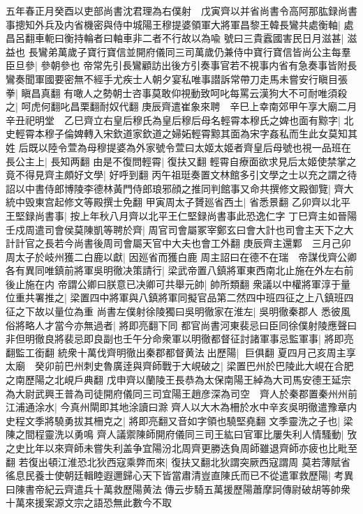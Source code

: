 五年春正月癸酉以吏部尚書沈君理為右僕射　戊寅齊以并省尚書令高阿那肱録尚書事摠知外兵及内省機密與侍中城陽王穆提婆領軍大將軍昌黎王韓長鸞共處衡軸|{
	處昌呂翻車軛曰衡持輪者曰軸車非二者不行故以為喩}
號曰三貴蠧國害民日月滋甚|{
	滋益也}
長鸞弟萬歲子寶行寶信並開府儀同三司萬歲仍兼侍中寶行寶信皆尚公主每羣臣旦參|{
	參朝參也}
帝常先引長鸞顧訪出後方引奏事官若不視事内省有急奏事皆附長鸞奏聞軍國要密無不經手尤疾士人朝夕宴私唯事譛訴常帶刀走馬未嘗安行瞋目張拳|{
	瞋昌真翻}
有噉人之勢朝士咨事莫敢仰視動致呵叱每罵云漢狗大不可耐唯須殺之|{
	呵虎何翻叱昌栗翻耐奴代翻}
庚辰齊遣崔象來聘　辛巳上幸南郊甲午享大廟二月辛丑祀明堂　乙巳齊立右皇后穆氏為皇后穆后母名輕霄本穆氏之婢也面有黥字|{
	北史輕霄本穆子倫婢轉入宋欽道家欽道之婦妬輕霄黥其面為宋字姦私而生此女莫知其姓}
后既以陸令萱為母穆提婆為外家號令萱曰太姬太姬者齊皇后母號也視一品班在長公主上|{
	長知两翻}
由是不復問輕霄|{
	復扶又翻}
輕霄自療面欲求見后太姬使禁掌之竟不得見齊主頗好文學|{
	好呼到翻}
丙午祖珽奏置文林館多引文學之士以充之謂之待詔以中書侍郎博陵李德林黃門侍郎琅邪顔之推同判館事又命共撰修文殿御覽|{
	齊大統中毁東宫起修文等殿撰士免翻}
甲寅周太子贇廵省西土|{
	省悉景翻}
乙卯齊以北平王堅録尚書事|{
	按上年秋八月齊以北平王仁堅録尚書事此恐逸仁字}
丁巳齊主如晉陽　壬戍周遣司會侯莫陳凱等聘於齊|{
	周官司會屬冢宰鄭玄曰會大計也司會主天下之大計計官之長若今尚書後周司會屬天官中大夫也會工外翻}
庚辰齊主還鄴　三月己卯周太子於岐州獲二白鹿以獻|{
	因廵省而獲白鹿}
周主詔曰在德不在瑞　帝謀伐齊公卿各有異同唯鎮前將軍吳明徹决策請行|{
	梁武帝置八鎮將軍東西南北止施在外左右前後止施在内}
帝謂公卿曰朕意已决卿可共舉元帥|{
	帥所類翻}
衆議以中權將軍淳于量位重共署推之|{
	梁置四中將軍與八鎮將軍同擬官品第二然四中班四征之上八鎮班四征之下故以量位為重}
尚書左僕射徐陵獨曰吳明徹家在淮左|{
	吳明徹秦郡人}
悉彼風俗將略人才當今亦無過者|{
	將即亮翻下同}
都官尚書河東裴忌曰臣同徐僕射陵應聲曰非但明徹良將裴忌即良副也壬午分命衆軍以明徹都督征討諸軍事忌監軍事|{
	將即亮翻監工銜翻}
統衆十萬伐齊明徹出秦郡都督黄法出歷陽|{
	巨俱翻}
夏四月己亥周主享太廟　癸卯前巴州刺史魯廣逹與齊師戰于大峴破之|{
	梁置巴州於巴陵此大峴在合肥之南歷陽之北峴戶典翻}
戊申齊以蘭陵王長恭為太保南陽王綽為大司馬安德王延宗為大尉武興王普為司徒開府儀同三司宜陽王趙彦深為司空　齊人於秦郡置秦州州前江浦通涂水|{
	今真州閘即其地涂讀曰滁}
齊人以大木為柵於水中辛亥吳明徹遣豫章内史程文季將驍勇拔其柵克之|{
	將即亮翻又音如字領也驍堅堯翻}
文季靈洗之子也|{
	梁陳之間程靈洗以勇鳴}
齊人議禦陳師開府儀同三司王紘曰官軍比屢失利人情騷動|{
	攷之史比年以來齊師未嘗失利盖争宜陽汾北周齊更勝迭負周師雖退齊師亦疲也比毗至翻}
若復出頓江淮恐北狄西寇乘弊而來|{
	復扶又翻北狄謂突厥西寇謂周}
莫若薄賦省徭息民養士使朝廷輯睦遐邇歸心天下皆當肅清豈直陳氏而已不從遣軍救歷陽|{
	考異曰陳書帝紀云齊遣兵十萬救歷陽黄法傳云步騎五萬援歷陽蕭摩訶傳尉破胡等帥衆十萬來援案源文宗之語恐無此數今不取}

